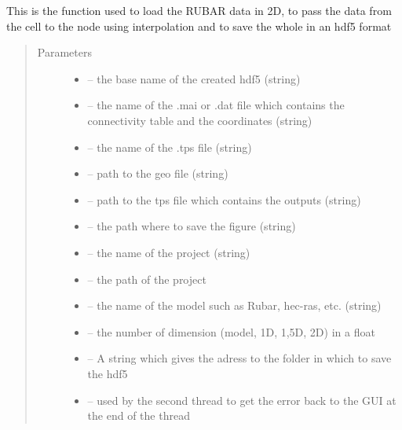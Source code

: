 \documentclass[letterpaper,10pt,english]{sphinxmanual}
\begin{document}
\begin{fulllineitems}
\label{\detokenize{index:src.rubar.load_rubar2d_and_create_grid}}
This is the function used to load the RUBAR data in 2D, to pass the data from the cell to the node using
interpolation and to save the whole in an hdf5 format
\begin{quote}\begin{description}
\item[{Parameters}] \leavevmode\begin{itemize}
\item {} 
 -- the base name of the created hdf5 (string)

\item {} 
 -- the name of the .mai or .dat file which contains the connectivity table and the coordinates (string)

\item {} 
 -- the name of the .tps file (string)

\item {} 
 -- path to the geo file (string)

\item {} 
 -- path to the tps file which contains the outputs (string)

\item {} 
 -- the path where to save the figure (string)

\item {} 
 -- the name of the project (string)

\item {} 
 -- the path of the project

\item {} 
 -- the name of the model such as Rubar, hec-ras, etc. (string)

\item {} 
 -- the number of dimension (model, 1D, 1,5D, 2D) in a float

\item {} 
 -- A string which gives the adress to the folder in which to save the hdf5

\item {} 
 -- used by the second thread to get the error back to the GUI at the end of the thread

\end{itemize}

\end{description}\end{quote}

\end{fulllineitems}
\end{document}
